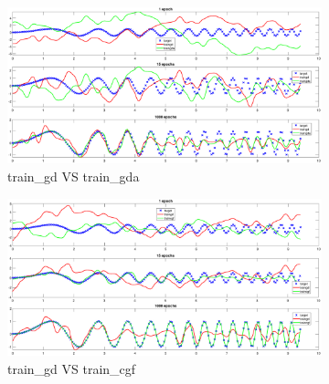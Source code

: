 \begin{figure}[ht]
	\begin{subfigure}[b]{0.33\textwidth}
		\centering
		\captionsetup{ width=0.8\linewidth, format = hang}
		\includegraphics[height = 0.7\textwidth, width = 1\textwidth]{Exercise1/Report/train_gd_gda}
		\caption{train\_gd VS train\_gda}\label{fig:train_gd_gda}
	\end{subfigure}%
	\begin{subfigure}[b]{0.33\textwidth}
		\centering
		\captionsetup{width=0.8\linewidth, format = hang}
		\includegraphics[height = 0.7\textwidth, width = 1\textwidth]{Exercise1/Report/train_gd_cgf}
		\caption{train\_gd VS  train\_cgf}\label{fig:train_gd_cgf}
	\end{subfigure}%
	\begin{subfigure}[b]{0.33\textwidth}
		\centering

\end{subfigure}
\end{figure}

